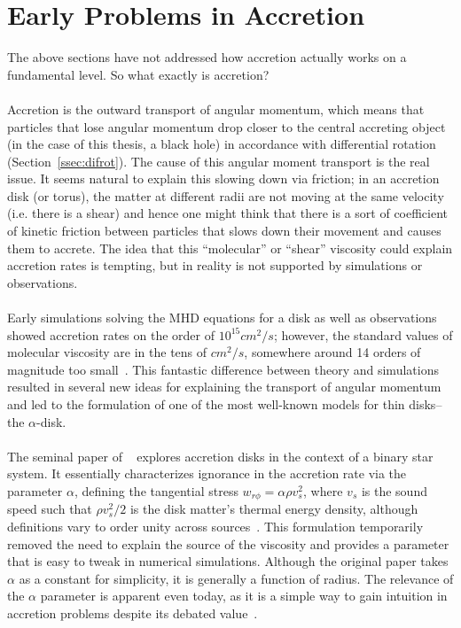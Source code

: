 
\section{Early Problems in Accretion}\label{sec:early}
The above sections have not addressed how accretion actually works on a fundamental level. So what exactly is accretion? \\
\\
Accretion is the outward transport of angular momentum, which means that particles that lose angular momentum drop closer to the central accreting object (in the case of this thesis, a black hole) in accordance with differential rotation (Section~\ref{ssec:difrot}). The cause of this angular moment transport is the real issue. It seems natural to explain this slowing down via friction; in an accretion disk (or torus), the matter at different radii are not moving at the same velocity (i.e. there is a shear) and hence one might think that there is a sort of coefficient of kinetic friction between particles that slows down their movement and causes them to accrete. The idea that this ``molecular'' or ``shear'' viscosity could explain accretion rates is tempting, but in reality is not supported by simulations or observations.\\
\\
Early simulations solving the MHD equations for a disk as well as observations showed accretion rates on the order of $10^{15}cm^2/s$; however, the standard values of molecular viscosity are in the tens of $cm^2/s$, somewhere around 14 orders of magnitude too small~\cite{Spruit2009}. This fantastic difference between theory and simulations resulted in several new ideas for explaining the transport of angular momentum and led to the formulation of one of the most well-known models for thin disks--the $\alpha$-disk.\\
\\
The seminal paper of ~\citet{SS1973} explores accretion disks in the context of a binary star system. It essentially characterizes ignorance in the accretion rate via the parameter $\alpha$, defining the tangential stress $w_{r\phi}=\alpha\rho v_s^2$, where $v_s$ is the sound speed such that $\rho v_s^2/2$ is the disk matter's thermal energy density, although definitions vary to order unity across sources~\cite{SS1973}. This formulation temporarily removed the need to explain the source of the viscosity and provides a parameter that is easy to tweak in numerical simulations. Although the original paper takes $\alpha$ as a constant for simplicity, it is generally a function of radius. The relevance of the $\alpha$ parameter is apparent even today, as it is a simple way to gain intuition in accretion problems despite its debated value~\cite{Penna2013}. \\
